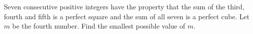 Seven consecutive positive integers have the property that the sum of the third, fourth and fifth is a perfect square and the sum of all seven is a perfect cube. Let $m$ be the fourth number. Find the smallest possible value of $m$.
